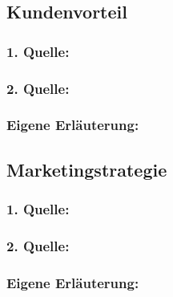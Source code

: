     \subsection{Kundenvorteil}
        \subsubsection*{1. Quelle:}
        \begin{abstract}
        \end{abstract}
        \subsubsection*{2. Quelle:}
        \begin{abstract}
        \end{abstract}
        \subsubsection*{Eigene Erläuterung:}
        \begin{abstract}
        \end{abstract}
    \subsection{Marketingstrategie}
        \subsubsection*{1. Quelle:}
        \begin{abstract}
        \end{abstract}
        \subsubsection*{2. Quelle:}
        \begin{abstract}
        \end{abstract}
        \subsubsection*{Eigene Erläuterung:}
        \begin{abstract}
        \end{abstract}
